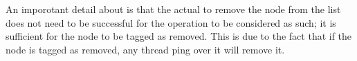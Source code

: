 

An imporotant detail about  is that the actual  to remove the node
from the list does not need to be successful for the operation to be considered as such; it is
sufficient for the node to be tagged as removed. This is due to the fact that if the node is tagged
as removed, any thread ping over it will remove it.
